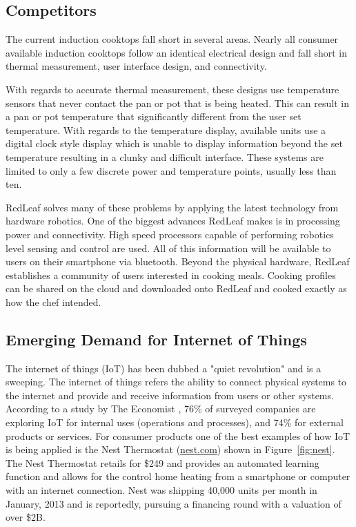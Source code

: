 \documentclass[11pt]{article}
\theoremstyle{definition}
\begin{document}
\subsection{Competitors}
The current induction cooktops fall short in several areas. Nearly all consumer available induction cooktops follow an identical electrical design and fall short in thermal measurement, user interface design, and connectivity. 

With regards to accurate thermal measurement, these designs use temperature sensors that never contact the pan or pot that is being heated. This can result in a pan or pot temperature that significantly different from the user set temperature. With regards to the temperature display, available units use a digital clock style display which is unable to display information beyond the set temperature resulting in a clunky and difficult interface. These systems are limited to only a few discrete power and temperature points, usually less than ten. 

RedLeaf solves many of these problems by applying the latest technology from hardware robotics. One of the biggest advances RedLeaf makes is in processing power and connectivity. High speed processors capable of performing robotics level sensing and control are used. All of this information will be available to users on their smartphone via bluetooth. Beyond the physical hardware, RedLeaf establishes a community of users interested in cooking meals. Cooking profiles can be shared on the cloud and downloaded onto RedLeaf and cooked exactly as how the chef intended.


\subsection{Emerging Demand for Internet of Things}

The internet of things (IoT) has been dubbed a "quiet revolution" and is a sweeping. The internet of things refers the ability to connect physical systems to the internet and provide and receive information from users or other systems. According to a study by The Economist \cite{iot}, 76\% of surveyed companies are exploring IoT for internal uses (operations and processes), and 74\% for external products or services. For consumer products one of the best examples of how IoT is being applied is the Nest Thermostat (\href{https://nest.com/}{nest.com})  shown in Figure~\ref{fig:nest}. The Nest Thermostat retails for \$249 and provides an automated learning function and allows for the control home heating from a smartphone or computer with an internet connection. Nest was shipping 40,000 units per month in January, 2013 \cite{nest_sales} and is reportedly, pursuing a financing round with a valuation of over \$2B\cite{nest_valuation}.
\end{document}
